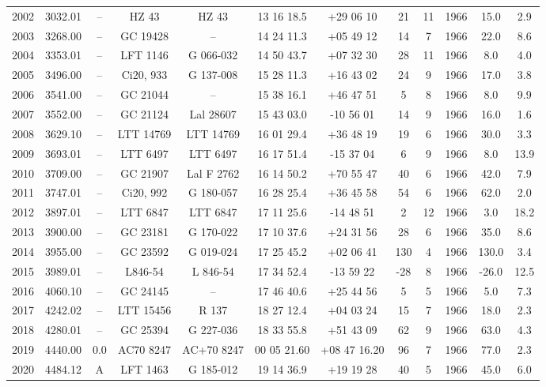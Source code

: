\begin{table}
\begin{tabular}{cccccccccccc}
2002 & 3032.01 & -- & HZ 43 & HZ 43 & 13 16 18.5 & +29 06 10 & 21 & 11 & 1966 & 15.0 & 2.9 \\
2003 & 3268.00 & -- & GC 19428 & -- & 14 24 11.3 & +05 49 12 & 14 & 7 & 1966 & 22.0 & 8.6 \\
2004 & 3353.01 & -- & LFT 1146 & G 066-032 & 14 50 43.7 & +07 32 30 & 28 & 11 & 1966 & 8.0 & 4.0 \\
2005 & 3496.00 & -- & Ci20, 933 & G 137-008 & 15 28 11.3 & +16 43 02 & 24 & 9 & 1966 & 17.0 & 3.8 \\
2006 & 3541.00 & -- & GC 21044 & -- & 15 38 16.1 & +46 47 51 & 5 & 8 & 1966 & 8.0 & 9.9 \\
2007 & 3552.00 & -- & GC 21124 & Lal 28607 & 15 43 03.0 & -10 56 01 & 14 & 9 & 1966 & 16.0 & 1.6 \\
2008 & 3629.10 & -- & LTT 14769 & LTT 14769 & 16 01 29.4 & +36 48 19 & 19 & 6 & 1966 & 30.0 & 3.3 \\
2009 & 3693.01 & -- & LTT 6497 & LTT 6497 & 16 17 51.4 & -15 37 04 & 6 & 9 & 1966 & 8.0 & 13.9 \\
2010 & 3709.00 & -- & GC 21907 & Lal F 2762 & 16 14 50.2 & +70 55 47 & 40 & 6 & 1966 & 42.0 & 7.9 \\
2011 & 3747.01 & -- & Ci20, 992 & G 180-057 & 16 28 25.4 & +36 45 58 & 54 & 6 & 1966 & 62.0 & 2.0 \\
2012 & 3897.01 & -- & LTT 6847 & LTT 6847 & 17 11 25.6 & -14 48 51 & 2 & 12 & 1966 & 3.0 & 18.2 \\
2013 & 3900.00 & -- & GC 23181 & G 170-022 & 17 10 37.6 & +24 31 56 & 28 & 6 & 1966 & 35.0 & 8.6 \\
2014 & 3955.00 & -- & GC 23592 & G 019-024 & 17 25 45.2 & +02 06 41 & 130 & 4 & 1966 & 130.0 & 3.4 \\
2015 & 3989.01 & -- & L846-54 & L 846-54 & 17 34 52.4 & -13 59 22 & -28 & 8 & 1966 & -26.0 & 12.5 \\
2016 & 4060.10 & -- & GC 24145 & -- & 17 46 40.6 & +25 44 56 & 5 & 5 & 1966 & 5.0 & 7.3 \\
2017 & 4242.02 & -- & LTT 15456 & R 137 & 18 27 12.4 & +04 03 24 & 15 & 7 & 1966 & 18.0 & 2.3 \\
2018 & 4280.01 & -- & GC 25394 & G 227-036 & 18 33 55.8 & +51 43 09 & 62 & 9 & 1966 & 63.0 & 4.3 \\
2019 & 4440.00 & 0.0 & AC70 8247 & AC+70 8247 & 00 05 21.60 & +08 47 16.20 & 96 & 7 & 1966 & 77.0 & 2.3 \\
2020 & 4484.12 & A & LFT 1463 & G 185-012 & 19 14 36.9 & +19 19 28 & 40 & 5 & 1966 & 45.0 & 6.0 \\

\end{tabular}
\end{table}
